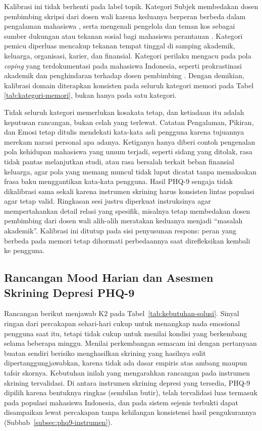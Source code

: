 Kalibrasi ini tidak berhenti pada label topik. Kategori Subjek membedakan dosen pembimbing skripsi dari dosen wali karena keduanya berperan berbeda dalam pengalaman mahasiswa \parencite{sherlywati2022academicadvisor}, serta mengenali pengelola dan teman kos sebagai sumber dukungan atau tekanan sosial bagi mahasiswa perantauan \parencite{putri2025boardinghouse}. Kategori pemicu diperluas mencakup tekanan tempat tinggal di samping akademik, keluarga, organisasi, karier, dan finansial. Kategori perilaku mengacu pada pola \textit{coping} yang terdokumentasi pada mahasiswa Indonesia, seperti prokrastinasi akademik dan penghindaran terhadap dosen pembimbing \parencite{fernanda2025procrastination}. Dengan demikian, kalibrasi domain diterapkan konsisten pada seluruh kategori memori pada Tabel \ref{tab:kategori-memori}, bukan hanya pada satu kategori.

Tidak seluruh kategori memerlukan kosakata tetap, dan ketiadaan itu adalah keputusan rancangan, bukan celah yang terlewat. Catatan Pengalaman, Pikiran, dan Emosi tetap ditulis mendekati kata-kata asli pengguna karena tujuannya merekam narasi personal apa adanya. Ketiganya hanya diberi contoh pengenalan pola kehidupan mahasiswa yang umum terjadi, seperti sidang yang ditolak, rasa tidak pantas melanjutkan studi, atau rasa bersalah terkait beban finansial keluarga, agar pola yang memang muncul tidak luput dicatat tanpa memaksakan frasa baku menggantikan kata-kata pengguna. Hasil PHQ-9 sengaja tidak dikalibrasi sama sekali karena instrumen skrining harus konsisten lintas populasi agar tetap valid. Ringkasan sesi justru diperkuat instruksinya agar mempertahankan detail relasi yang spesifik, misalnya tetap membedakan dosen pembimbing dari dosen wali alih-alih meratakan keduanya menjadi ``masalah akademik''. Kalibrasi ini ditutup pada sisi penyusunan respons: peran yang berbeda pada memori tetap dihormati perbedaannya saat direfleksikan kembali ke pengguna.

\subsection{Rancangan Mood Harian dan Asesmen Skrining Depresi PHQ-9}
\label{subsec:rancangan-mood-phq9}
\label{subsec:rancangan-jitai-gate}
\label{subsec:rancangan-state-phq9}
\label{subsec:rancangan-eskalasi-item9}

Rancangan berikut menjawab K2 pada Tabel~\ref{tab:kebutuhan-solusi}. Sinyal ringan dari percakapan sehari-hari cukup untuk menangkap nada emosional pengguna saat itu, tetapi tidak cukup untuk menilai kondisi yang berkembang selama beberapa minggu. Menilai perkembangan semacam ini dengan pertanyaan buatan sendiri berisiko menghasilkan skrining yang hasilnya sulit dipertanggungjawabkan, karena tidak ada dasar empiris atas ambang maupun tafsir skornya. Kebutuhan inilah yang mengarahkan rancangan pada instrumen skrining tervalidasi. Di antara instrumen skrining depresi yang tersedia, PHQ-9 dipilih karena bentuknya ringkas (sembilan butir), telah tervalidasi luas termasuk pada populasi mahasiswa Indonesia, dan pada sistem sejenis terbukti dapat disampaikan lewat percakapan tanpa kehilangan konsistensi hasil pengukurannya (Subbab~\ref{subsec:phq9-instrumen}).

